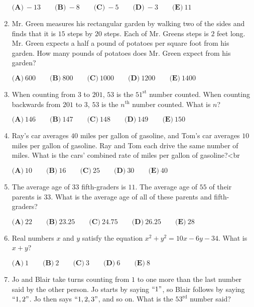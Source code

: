 \documentclass{article}
\begin{document}
\begin{enumerate}[label=\arabic*., itemsep=0.5em]
$\textbf{(A)}\ -13 \qquad \textbf{(B)}\ -8 \qquad \textbf{(C)}\ -5 \qquad \textbf{(D)}\ -3 \qquad \textbf{(E)}\ 11$\par \vspace{0.5em}\item Mr. Green measures his rectangular garden by walking two of the sides and finds that it is $15$ steps by $20$ steps. Each of Mr. Greens steps is $2$ feet long. Mr. Green expects a half a pound of potatoes per square foot from his garden. How many pounds of potatoes does Mr. Green expect from his garden?

$\textbf{(A)}\ 600 \qquad \textbf{(B)}\ 800 \qquad \textbf{(C)}\ 1000 \qquad \textbf{(D)}\ 1200 \qquad \textbf{(E)}\ 1400$\par \vspace{0.5em}\item When counting from $3$ to $201$, $53$ is the $51^{\text{st}}$ number counted. When counting backwards from $201$ to $3$, $53$ is the $n^{\text{th}}$ number counted. What is $n$?

$\textbf{(A)}\ 146 \qquad \textbf{(B)}\ 147 \qquad \textbf{(C)}\ 148 \qquad \textbf{(D)}\ 149 \qquad \textbf{(E)}\ 150$\par \vspace{0.5em}\item Ray's car averages $40$ miles per gallon of gasoline, and Tom's car averages $10$ miles per gallon of gasoline. Ray and Tom each drive the same number of miles. What is the cars' combined rate of miles per gallon of gasoline?<br \>

$\textbf{(A)}\ 10 \qquad \textbf{(B)}\ 16 \qquad \textbf{(C)}\ 25 \qquad \textbf{(D)}\ 30 \qquad \textbf{(E)}\ 40$\par \vspace{0.5em}\item The average age of $33$ fifth-graders is $11$. The average age of $55$ of their parents is $33$. What is the average age of all of these parents and fifth-graders?

$\textbf{(A)}\ 22 \qquad \textbf{(B)}\ 23.25 \qquad \textbf{(C)}\ 24.75 \qquad \textbf{(D)}\ 26.25 \qquad \textbf{(E)}\ 28$\par \vspace{0.5em}\item Real numbers $x$ and $y$ satisfy the equation $x^2 + y^2 = 10x - 6y - 34$. What is $x + y$?

$\textbf{(A)}\ 1 \qquad \textbf{(B)}\ 2 \qquad \textbf{(C)}\ 3 \qquad \textbf{(D)}\ 6 \qquad \textbf{(E)}\ 8$\par \vspace{0.5em}\item Jo and Blair take turns counting from $1$ to one more than the last number said by the other person. Jo starts by saying $``1"$, so Blair follows by saying $``1, 2"$. Jo then says $``1, 2, 3"$, and so on. What is the $53^{\text{rd}}$ number said?


\end{enumerate}
\end{document}
